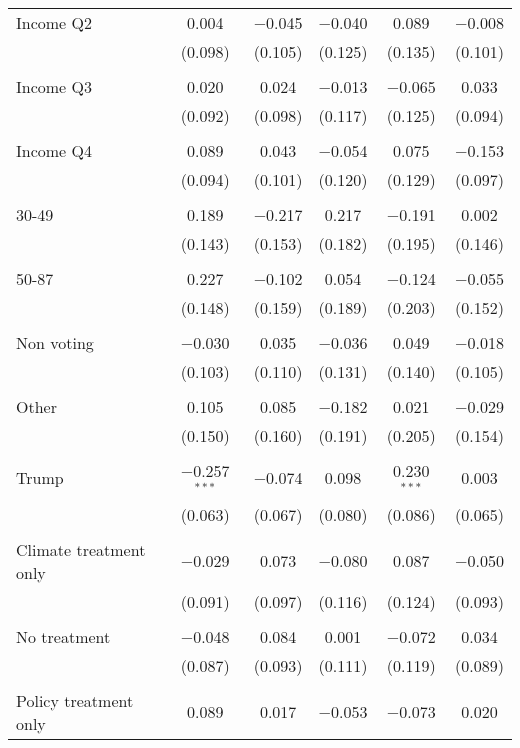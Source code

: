 \begin{tabular}{@{\extracolsep{5pt}}lccccc}
 Income Q2 & 0.004 & $-$0.045 & $-$0.040 & 0.089 & $-$0.008 \\ 
  & (0.098) & (0.105) & (0.125) & (0.135) & (0.101) \\ 
  & & & & & \\ 
 Income Q3 & 0.020 & 0.024 & $-$0.013 & $-$0.065 & 0.033 \\ 
  & (0.092) & (0.098) & (0.117) & (0.125) & (0.094) \\ 
  & & & & & \\ 
 Income Q4 & 0.089 & 0.043 & $-$0.054 & 0.075 & $-$0.153 \\ 
  & (0.094) & (0.101) & (0.120) & (0.129) & (0.097) \\ 
  & & & & & \\ 
 30-49 & 0.189 & $-$0.217 & 0.217 & $-$0.191 & 0.002 \\ 
  & (0.143) & (0.153) & (0.182) & (0.195) & (0.146) \\ 
  & & & & & \\ 
 50-87 & 0.227 & $-$0.102 & 0.054 & $-$0.124 & $-$0.055 \\ 
  & (0.148) & (0.159) & (0.189) & (0.203) & (0.152) \\ 
  & & & & & \\ 
 Non voting & $-$0.030 & 0.035 & $-$0.036 & 0.049 & $-$0.018 \\ 
  & (0.103) & (0.110) & (0.131) & (0.140) & (0.105) \\ 
  & & & & & \\ 
 Other & 0.105 & 0.085 & $-$0.182 & 0.021 & $-$0.029 \\ 
  & (0.150) & (0.160) & (0.191) & (0.205) & (0.154) \\ 
  & & & & & \\ 
 Trump & $-$0.257$^{***}$ & $-$0.074 & 0.098 & 0.230$^{***}$ & 0.003 \\ 
  & (0.063) & (0.067) & (0.080) & (0.086) & (0.065) \\ 
  & & & & & \\ 
 Climate treatment only & $-$0.029 & 0.073 & $-$0.080 & 0.087 & $-$0.050 \\ 
  & (0.091) & (0.097) & (0.116) & (0.124) & (0.093) \\ 
  & & & & & \\ 
 No treatment & $-$0.048 & 0.084 & 0.001 & $-$0.072 & 0.034 \\ 
  & (0.087) & (0.093) & (0.111) & (0.119) & (0.089) \\ 
  & & & & & \\ 
 Policy treatment only & 0.089 & 0.017 & $-$0.053 & $-$0.073 & 0.020 \\ 

\end{tabular}
